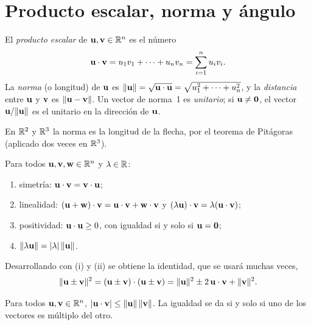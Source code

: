 \addtocounter{definicion}{1}%

\section{Producto escalar, norma y ángulo}

\begin{definicion}\label{def:escalar}
El \emph{producto escalar} de $\mathbf{u},\mathbf{v}\in\mathbb{R}^n$ es el número
\[
\mathbf{u}\cdot\mathbf{v}=u_1v_1+\dots+u_nv_n=\sum_{i=1}^{n}u_iv_i .
\]
La \emph{norma} (o longitud) de $\mathbf{u}$ es $\lVert\mathbf{u}\rVert=\sqrt{\mathbf{u}\cdot\mathbf{u}}=\sqrt{u_1^2+\dots+u_n^2}$, y la \emph{distancia} entre $\mathbf{u}$ y $\mathbf{v}$ es $\lVert\mathbf{u}-\mathbf{v}\rVert$. Un vector de norma~1 es \emph{unitario}; si $\mathbf{u}\neq\mathbf{0}$, el vector $\mathbf{u}/\lVert\mathbf{u}\rVert$ es el unitario en la dirección de $\mathbf{u}$.
\end{definicion}

En $\mathbb{R}^2$ y $\mathbb{R}^3$ la norma es la longitud de la flecha, por el teorema de Pitágoras (aplicado dos veces en $\mathbb{R}^3$).

\begin{proposicion}\label{prop:escalar}
Para todos $\mathbf{u},\mathbf{v},\mathbf{w}\in\mathbb{R}^n$ y $\lambda\in\mathbb{R}$:
\begin{enumerate}
  \item simetría: $\mathbf{u}\cdot\mathbf{v}=\mathbf{v}\cdot\mathbf{u}$;
  \item linealidad: $(\mathbf{u}+\mathbf{w})\cdot\mathbf{v}=\mathbf{u}\cdot\mathbf{v}+\mathbf{w}\cdot\mathbf{v}$ y $(\lambda\mathbf{u})\cdot\mathbf{v}=\lambda(\mathbf{u}\cdot\mathbf{v})$;
  \item positividad: $\mathbf{u}\cdot\mathbf{u}\ge 0$, con igualdad si y solo si $\mathbf{u}=\mathbf{0}$;
  \item $\lVert\lambda\mathbf{u}\rVert=\lvert\lambda\rvert\,\lVert\mathbf{u}\rVert$.
\end{enumerate}
\end{proposicion}

Desarrollando con (i) y (ii) se obtiene la identidad, que se usará muchas veces,
\begin{equation}\label{eq:t1-desarrollo}
\lVert\mathbf{u}\pm\mathbf{v}\rVert^2=(\mathbf{u}\pm\mathbf{v})\cdot(\mathbf{u}\pm\mathbf{v})=\lVert\mathbf{u}\rVert^2\pm2\,\mathbf{u}\cdot\mathbf{v}+\lVert\mathbf{v}\rVert^2 .
\end{equation}

\begin{teorema}\label{teo:cs}
Para todos $\mathbf{u},\mathbf{v}\in\mathbb{R}^n$, $\lvert\mathbf{u}\cdot\mathbf{v}\rvert\le\lVert\mathbf{u}\rVert\,\lVert\mathbf{v}\rVert$. La igualdad se da si y solo si uno de los vectores es múltiplo del otro.
\end{teorema}

